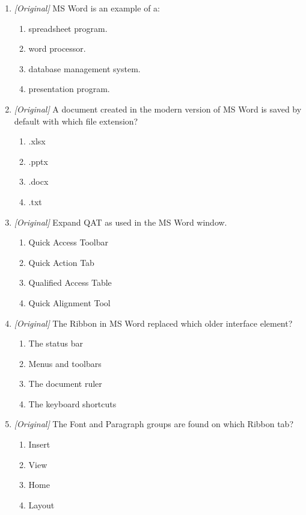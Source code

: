 \begin{enumerate}[label=\textbf{Q\arabic*.}, leftmargin=*]
\item \textit{[Original]} MS Word is an example of a:
  \begin{enumerate}[label=\Alph*.]
    \item spreadsheet program.
    \item word processor.
    \item database management system.
    \item presentation program.
  \end{enumerate}
\item \textit{[Original]} A document created in the modern version of MS Word
  is saved by default with which file extension?
  \begin{enumerate}[label=\Alph*.]
    \item .xlsx
    \item .pptx
    \item .docx
    \item .txt
  \end{enumerate}
\item \textit{[Original]} Expand QAT as used in the MS Word window.
  \begin{enumerate}[label=\Alph*.]
    \item Quick Access Toolbar
    \item Quick Action Tab
    \item Qualified Access Table
    \item Quick Alignment Tool
  \end{enumerate}
\item \textit{[Original]} The Ribbon in MS Word replaced which older
  interface element?
  \begin{enumerate}[label=\Alph*.]
    \item The status bar
    \item Menus and toolbars
    \item The document ruler
    \item The keyboard shortcuts
  \end{enumerate}
\item \textit{[Original]} The Font and Paragraph groups are found on which
  Ribbon tab?
  \begin{enumerate}[label=\Alph*.]
    \item Insert
    \item View
    \item Home
    \item Layout

\end{enumerate}
\end{enumerate}
